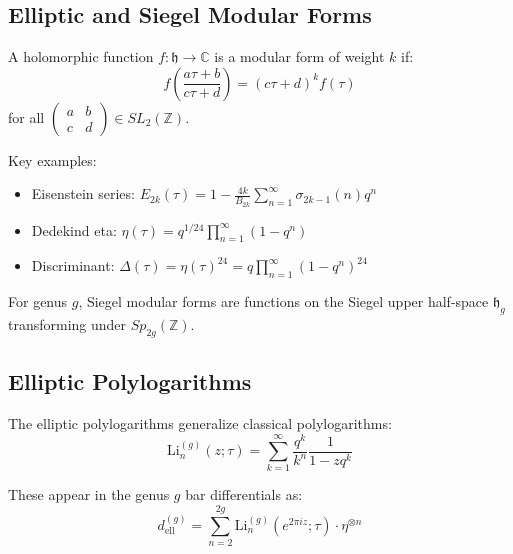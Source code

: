 \subsection{Elliptic and Siegel Modular Forms}

\begin{definition}
A holomorphic function $f: \mathfrak{h} \to \mathbb{C}$ is a modular form of weight $k$ if:
$$f\left(\frac{a\tau+b}{c\tau+d}\right) = (c\tau+d)^k f(\tau)$$
for all $\begin{pmatrix} a & b \\ c & d \end{pmatrix} \in SL_2(\mathbb{Z})$.
\end{definition}

Key examples:
\begin{itemize}
\item Eisenstein series: $E_{2k}(\tau) = 1 - \frac{4k}{B_{2k}}\sum_{n=1}^\infty \sigma_{2k-1}(n)q^n$
\item Dedekind eta: $\eta(\tau) = q^{1/24}\prod_{n=1}^\infty(1-q^n)$
\item Discriminant: $\Delta(\tau) = \eta(\tau)^{24} = q\prod_{n=1}^\infty(1-q^n)^{24}$
\end{itemize}

For genus $g$, Siegel modular forms are functions on the Siegel upper half-space $\mathfrak{h}_g$ transforming under $Sp_{2g}(\mathbb{Z})$.

\subsection{Elliptic Polylogarithms}

The elliptic polylogarithms generalize classical polylogarithms:
\[
\text{Li}_n^{(g)}(z;\tau) = \sum_{k=1}^\infty \frac{q^k}{k^n}\frac{1}{1-zq^k}
\]

These appear in the genus $g$ bar differentials as:
\[
d^{(g)}_{\text{ell}} = \sum_{n=2}^{2g} \text{Li}_n^{(g)}(e^{2\pi iz};\tau) \cdot \eta^{\otimes n}
\]
